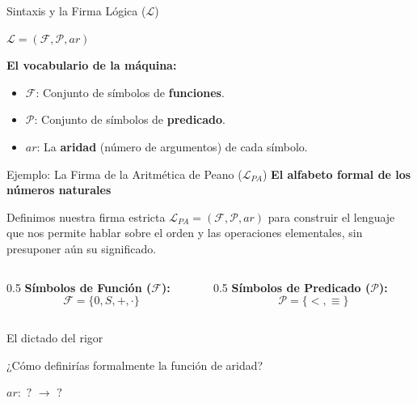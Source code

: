 \documentclass[10pt, aspectratio=169]{beamer}
\begin{document}
\begin{frame}{Sintaxis y la Firma Lógica ($\mathcal{L}$)}
    \begin{center}
        \huge $\mathcal{L} = (\mathcal{F}, \mathcal{P}, ar)$
    \end{center}
    
    \vspace{0.8cm}
    \Large \textbf{El vocabulario de la máquina:}
    \normalsize
    \vspace{0.3cm}
    \begin{itemize}
        \setlength\itemsep{0.3cm}
        \item $\mathcal{F}$: Conjunto de símbolos de \textbf{funciones}.
        \item $\mathcal{P}$: Conjunto de símbolos de \textbf{predicado}.
        \item $ar$: La \textbf{aridad} (número de argumentos) de cada símbolo.
    \end{itemize}
\end{frame}
\begin{frame}{Ejemplo: La Firma de la Aritmética de Peano ($\mathcal{L}_{PA}$)}
    \vspace{0.3cm}
    \Large \textbf{El alfabeto formal de los números naturales}
    
    \vspace{0.6cm}
    \normalsize
    Definimos nuestra firma estricta $\mathcal{L}_{PA} = (\mathcal{F}, \mathcal{P}, ar)$ para construir el lenguaje que nos permite hablar sobre el orden y las operaciones elementales, sin presuponer aún su significado.
    
    \vspace{0.8cm}
    \begin{columns}
        \begin{column}{0.5\textwidth}
            \alert{\textbf{Símbolos de Función ($\mathcal{F}$):}}
            \vspace{0.2cm}
            \huge $$\mathcal{F} = \{0, S, +, \cdot\}$$
        \end{column}
        \begin{column}{0.5\textwidth}
            \alert{\textbf{Símbolos de Predicado ($\mathcal{P}$):}}
            \vspace{0.2cm}
            \huge $$\mathcal{P} = \{<, \equiv\}$$
        \end{column}
    \end{columns}
\end{frame}
\begin{frame}{El dictado del rigor}
    \begin{center}
        \alert{\huge ¿Cómo definirías formalmente la función de aridad?}
        
        \vspace{0.8cm}
        \Large $ar: \text{ ? } \to \text{ ? }$
    \end{center}
\end{frame}
\end{document}
